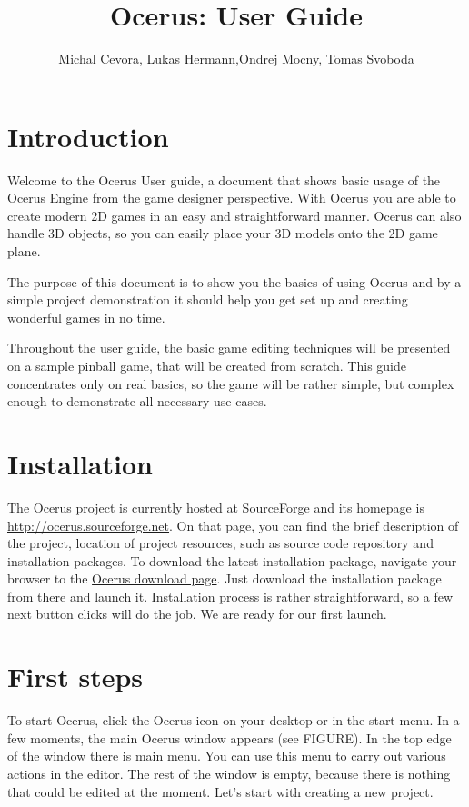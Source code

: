 \documentclass[a4paper,12pt]{article}
\title{Ocerus: User Guide}
\author{Michal Cevora, Lukas Hermann,Ondrej Mocny, Tomas Svoboda}
\date{}
\begin{document}
\maketitle

\tableofcontents

\section{Introduction}

Welcome to the Ocerus User guide, a document that shows basic usage of the Ocerus Engine from the game designer perspective. With Ocerus you are able to create modern 2D games in an easy and straightforward manner. Ocerus can also handle 3D objects, so you can easily place your 3D models onto the 2D game plane.


The purpose of this document is to show you the basics of using Ocerus and by a simple project demonstration it should help you get set up and creating wonderful games in no time. 

Throughout the user guide, the basic game editing techniques will be presented on a sample pinball game, that will be created from scratch. This guide concentrates only on real basics, so the game will be rather simple, but complex enough to demonstrate all necessary use cases.

\section{Installation}
The Ocerus project is currently hosted at SourceForge and its homepage is \url{http://ocerus.sourceforge.net}. On that page, you can find the brief description of the project, location of project resources, such as source code repository and installation packages. To download the latest installation package, navigate your browser to the \href{http://sourceforge.net/projects/ocerus/files/}{Ocerus download page}. Just download the installation package from there and launch it. Installation process is rather straightforward, so a few next button clicks will do the job. We are ready for our first launch.

\section{First steps}
To start Ocerus, click the Ocerus icon on your desktop or in the start menu. In a few moments, the main Ocerus window appears (see FIGURE). In the top edge of the window there is main menu. You can use this menu to carry out various actions in the editor. The rest of the window is empty, because there is nothing that could be edited at the moment. Let's start with creating a new project.
\end{document}
